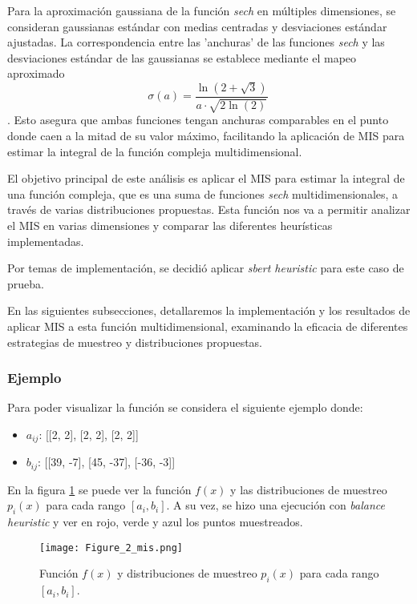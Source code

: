 \documentclass{article}
\begin{document}
Para la aproximación gaussiana de la función \textit{sech} en múltiples dimensiones, se consideran gaussianas estándar con medias centradas y desviaciones estándar ajustadas.
La correspondencia entre las 'anchuras' de las funciones \textit{sech} y las desviaciones estándar de las gaussianas se establece mediante el mapeo aproximado $$ \sigma(a) = \frac{\ln(2 + \sqrt{3})}{a \cdot \sqrt{2\ln(2)}} \ $$.
Esto asegura que ambas funciones tengan anchuras comparables en el punto donde caen a la mitad de su valor máximo, facilitando la aplicación de MIS para estimar la integral de la función compleja multidimensional.

El objetivo principal de este análisis es aplicar el MIS para estimar la integral de una función compleja, que es una suma de funciones \textit{sech} multidimensionales, a través de varias distribuciones propuestas.
Esta función nos va a permitir analizar el MIS en varias dimensiones y comparar las diferentes heurísticas implementadas.

Por temas de implementación, se decidió aplicar \textit{sbert heuristic} para este caso de prueba.

En las siguientes subsecciones, detallaremos la implementación y los resultados de aplicar MIS a esta función multidimensional, examinando la eficacia de diferentes estrategias de muestreo y distribuciones propuestas.

\subsubsection{Ejemplo}

Para poder visualizar la función se considera el siguiente ejemplo donde:

\begin{itemize}
    \item \textbf{\( a_{ij} \)}: [[2, 2], [2, 2], [2, 2]]
    \item \textbf{\( b_{ij} \)}: [[39, -7], [45, -37], [-36, -3]]
\end{itemize}

En la figura \ref{fig:mis2} se puede ver la función \( f(x) \) y las distribuciones de muestreo \( p_{i}(x) \) para cada rango \( [a_{i}, b_{i}] \).
A su vez, se hizo una ejecución con \textit{balance heuristic} y ver en rojo, verde y azul los puntos muestreados.

\begin{figure}[H]
\texttt{[image: Figure\_2\_mis.png]}
\caption{Función \( f(x) \) y distribuciones de muestreo \( p_{i}(x) \) para cada rango \( [a_{i}, b_{i}] \).}
\label{fig:mis2}
\end{figure}
\end{document}
